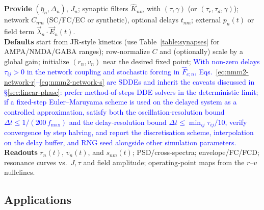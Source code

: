 \documentclass[12pt]{article}
\numberwithin{equation}{section}
\newcommand{\rev}[1]{\textcolor{blue}{#1}}
\begin{document}
\begin{tcolorbox}[
  colback=gray!5,
  colframe=slate,
  colbacktitle=softblue!25,
  coltitle=softblue!60!black,
  fonttitle=\bfseries\small,
  title={\small How to Use It — Minimal Guide (NMM2 Network)},
  boxrule=0.4pt, enhanced, sharp corners,
  left=4pt,right=4pt,top=3pt,bottom=3pt,
  boxsep=2pt, before skip=6pt, after skip=6pt
]
\scriptsize

\textbf{Provide} $(\bar\eta_n,\Delta_n)$, $J_n$; synaptic filters $\hat K_{nm}$ with $(\tau,\gamma)$ (or $(\tau_r,\tau_d,\gamma)$); network $C_{nm}$ (SC/FC/EC or synthetic), optional delays $t_{nm}$; external $p_n(t)$ or field term $\vec\lambda_n\!\cdot\!\vec E_n(t)$.\\
\textbf{Defaults} start from JR‑style kinetics (use Table~\ref{table:synapses} for AMPA/NMDA/GABA ranges); row‑normalize $C$ and (optionally) scale by a global gain; initialize $(r_n,v_n)$ near the desired fixed point; \rev{With non-zero delays $\tau_{ij}>0$ in the network coupling and stochastic forcing in $\hat F_{e;n}$, Eqs.~\eqref{eq:nmm2-network-r}--\eqref{eq:nmm2-network-s} are SDDEs and inherit the caveats discussed in \S\ref{sec:linear-phase}: prefer method-of-steps DDE solvers in the deterministic limit; if a fixed-step Euler--Maruyama scheme is used on the delayed system as a controlled approximation, satisfy both the oscillation-resolution bound $\Delta t \leq 1/(200\,f_{\max})$ and the delay-resolution bound $\Delta t \leq \min_{ij}\tau_{ij}/10$, verify convergence by step halving, and report the discretisation scheme, interpolation on the delay buffer, and RNG seed alongside other simulation parameters.}\\
\textbf{Readouts} $r_n(t)$, $v_n(t)$, and $s_{nm}(t)$; PSD/cross‑spectra; envelope/FC/FCD; resonance curves vs.\ $J,\tau$ and field amplitude; operating‑point maps from the $r$–$v$ nullclines.
\end{tcolorbox}



\subsection{Applications} 
\label{subsec:applications-nmm2}
\end{document}
